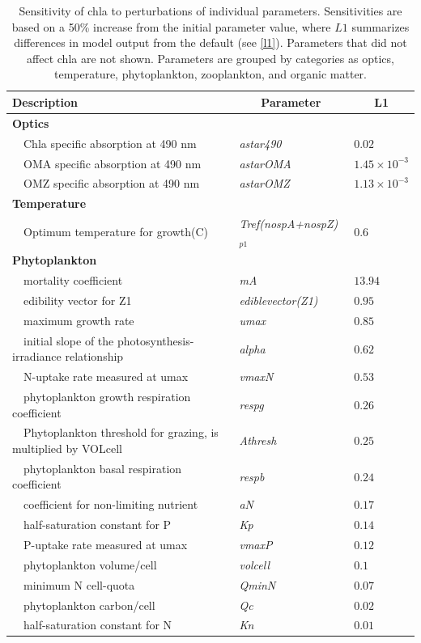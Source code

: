 \documentclass[preprint]{elsarticle}\usepackage[]{graphicx}\usepackage[]{color}
\begin{document}
\begin{table}[!tbp]
{\footnotesize
\caption{Sensitivity of \ac{chla} to perturbations of individual parameters.  Sensitivities are based on a 50\% increase from the initial parameter value, where $L1$ summarizes differences in model output from the default (see \cref{l1}).  Parameters that did not affect \ac{chla} are not shown.  Parameters are grouped by categories as optics, temperature, phytoplankton, zooplankton, and organic matter.\label{tab:chlsens}} 
\begin{center}
\begin{tabular}{lll}
\hline\hline
\multicolumn{1}{l}{Description}&\multicolumn{1}{c}{Parameter}&\multicolumn{1}{c}{L1}\tabularnewline
\hline
{\bfseries Optics}&&\tabularnewline
~~Chla specific absorption at 490 nm&\textit{astar490}&$0.02$\tabularnewline
~~OMA specific absorption at 490 nm&\textit{astarOMA}&$1.45\times 10^{-3}$\tabularnewline
~~OMZ specific absorption at 490 nm&\textit{astarOMZ}&$1.13\times 10^{-3}$\tabularnewline
\hline
{\bfseries Temperature}&&\tabularnewline
~~Optimum temperature for growth(C)&\textit{Tref(nospA+nospZ)$_{p1}$}&$0.6$\tabularnewline
\hline
{\bfseries Phytoplankton}&&\tabularnewline
~~mortality coefficient&\textit{mA}&$13.94$\tabularnewline
~~edibility vector for Z1&\textit{ediblevector(Z1)}&$0.95$\tabularnewline
~~maximum growth rate&\textit{umax}&$0.85$\tabularnewline
~~initial slope of the photosynthesis-irradiance relationship&\textit{alpha}&$0.62$\tabularnewline
~~N-uptake rate measured at umax&\textit{vmaxN}&$0.53$\tabularnewline
~~phytoplankton growth respiration coefficient&\textit{respg}&$0.26$\tabularnewline
~~Phytoplankton threshold for grazing, is multiplied by VOLcell&\textit{Athresh}&$0.25$\tabularnewline
~~phytoplankton basal respiration coefficient&\textit{respb}&$0.24$\tabularnewline
~~coefficient for non-limiting nutrient&\textit{aN}&$0.17$\tabularnewline
~~half-saturation constant for P&\textit{Kp}&$0.14$\tabularnewline
~~P-uptake rate measured at umax&\textit{vmaxP}&$0.12$\tabularnewline
~~phytoplankton volume/cell&\textit{volcell}&$0.1$\tabularnewline
~~minimum N cell-quota&\textit{QminN}&$0.07$\tabularnewline
~~phytoplankton carbon/cell&\textit{Qc}&$0.02$\tabularnewline
~~half-saturation constant for N&\textit{Kn}&$0.01$\tabularnewline

\end{tabular}
\end{center}}
\end{table}
\end{document}
